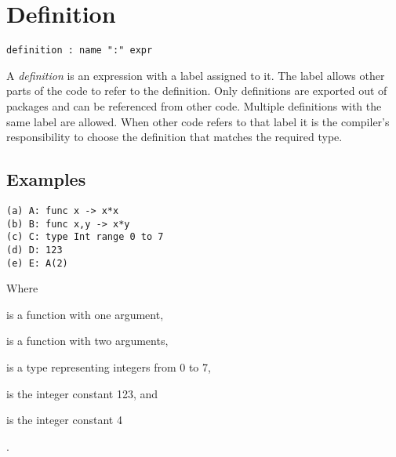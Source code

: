 \section{Definition}

\begin{verbatim}
definition : name ":" expr
\end{verbatim}


A \emph{definition} is an expression with a label assigned to it. The label
allows other parts of the code to refer to the definition. Only definitions are
exported out of packages and can be referenced from other code. Multiple
definitions with the same label are allowed. When other code refers to that
label it is the compiler's responsibility to choose the definition that matches
the required type.

\subsection{Examples}

\begin{verbatim}
(a) A: func x -> x*x
(b) B: func x,y -> x*y
(c) C: type Int range 0 to 7
(d) D: 123
(e) E: A(2)
\end{verbatim}

Where \begin{exdesc}
	\item is a function with one argument,
	\item is a function with two arguments,
	\item is a type representing integers from 0 to 7,
	\item is the integer constant 123, and
	\item is the integer constant 4
\end{exdesc}.
